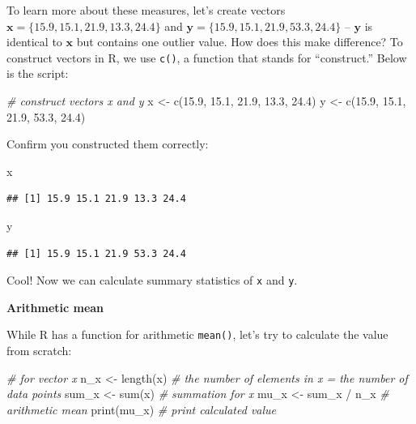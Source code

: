 \documentclass[
]{book}
\newenvironment{Shaded}{\begin{snugshade}}{\end{snugshade}}
\newcommand{\CommentTok}[1]{\textcolor[rgb]{0.56,0.35,0.01}{\textit{#1}}}
\newcommand{\FloatTok}[1]{\textcolor[rgb]{0.00,0.00,0.81}{#1}}
\newcommand{\FunctionTok}[1]{\textcolor[rgb]{0.00,0.00,0.00}{#1}}
\newcommand{\NormalTok}[1]{#1}
\newcommand{\OtherTok}[1]{\textcolor[rgb]{0.56,0.35,0.01}{#1}}
\newcommand{\SpecialCharTok}[1]{\textcolor[rgb]{0.00,0.00,0.00}{#1}}
\begin{document}
To learn more about these measures, let's create vectors \(\pmb{x} = \{15.9, 15.1, 21.9, 13.3, 24.4\}\) and \(\pmb{y} = \{15.9, 15.1, 21.9, 53.3, 24.4\}\) -- \(\pmb{y}\) is identical to \(\pmb{x}\) but contains one outlier value. How does this make difference? To construct vectors in R, we use \texttt{c()}, a function that stands for ``construct.'' Below is the script:

\begin{Shaded}
\begin{Highlighting}[]
\CommentTok{\# construct vectors x and y}
\NormalTok{x }\OtherTok{\textless{}{-}} \FunctionTok{c}\NormalTok{(}\FloatTok{15.9}\NormalTok{, }\FloatTok{15.1}\NormalTok{, }\FloatTok{21.9}\NormalTok{, }\FloatTok{13.3}\NormalTok{, }\FloatTok{24.4}\NormalTok{)}
\NormalTok{y }\OtherTok{\textless{}{-}} \FunctionTok{c}\NormalTok{(}\FloatTok{15.9}\NormalTok{, }\FloatTok{15.1}\NormalTok{, }\FloatTok{21.9}\NormalTok{, }\FloatTok{53.3}\NormalTok{, }\FloatTok{24.4}\NormalTok{)}
\end{Highlighting}
\end{Shaded}

Confirm you constructed them correctly:

\begin{Shaded}
\begin{Highlighting}[]
\NormalTok{x}
\end{Highlighting}
\end{Shaded}

\begin{verbatim}
## [1] 15.9 15.1 21.9 13.3 24.4
\end{verbatim}

\begin{Shaded}
\begin{Highlighting}[]
\NormalTok{y}
\end{Highlighting}
\end{Shaded}

\begin{verbatim}
## [1] 15.9 15.1 21.9 53.3 24.4
\end{verbatim}

Cool! Now we can calculate summary statistics of \texttt{x} and \texttt{y}.

\textbf{Arithmetic mean}

While R has a function for arithmetic \texttt{mean()}, let's try to calculate the value from scratch:

\begin{Shaded}
\begin{Highlighting}[]
\CommentTok{\# for vector x}
\NormalTok{n\_x }\OtherTok{\textless{}{-}} \FunctionTok{length}\NormalTok{(x) }\CommentTok{\# the number of elements in x = the number of data points}
\NormalTok{sum\_x }\OtherTok{\textless{}{-}} \FunctionTok{sum}\NormalTok{(x) }\CommentTok{\# summation for x}
\NormalTok{mu\_x }\OtherTok{\textless{}{-}}\NormalTok{ sum\_x }\SpecialCharTok{/}\NormalTok{ n\_x }\CommentTok{\# arithmetic mean}
\FunctionTok{print}\NormalTok{(mu\_x) }\CommentTok{\# print calculated value}
\end{Highlighting}
\end{Shaded}
\end{document}
